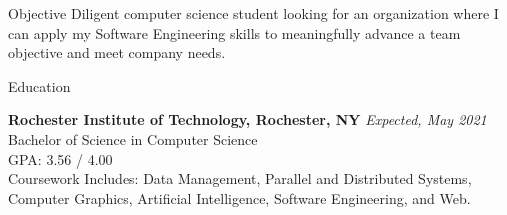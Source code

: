 \documentclass{resume} %
\begin{document}

\begin{rSection}{Objective}
Diligent computer science student looking for an organization where I can apply my Software Engineering skills to
 meaningfully advance a team objective and meet company needs. 
\end{rSection}

\begin{rSection}{Education}

{\bf Rochester Institute of Technology, Rochester, NY} \hfill {\em Expected, May 2021} 
\\ Bachelor of Science in Computer Science
\\ GPA: 3.56 / 4.00
\\ Coursework Includes:  Data Management, Parallel and Distributed Systems, Computer Graphics, Artificial Intelligence, Software Engineering, and Web.

\end{rSection}
\end{document}
